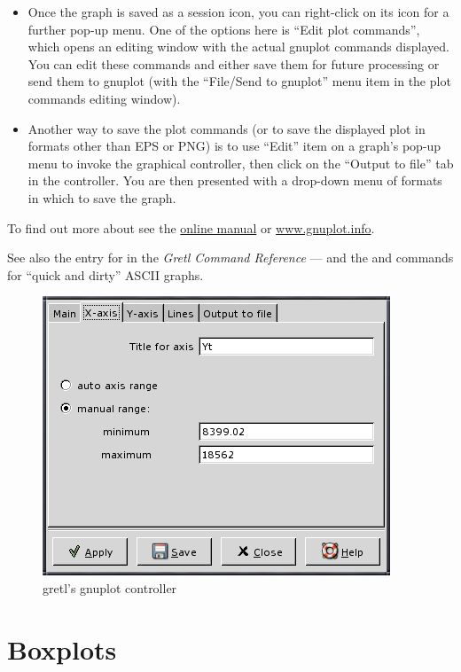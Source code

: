 \begin{itemize}
\item Once the graph is saved as a session icon, you can right-click
  on its icon for a further pop-up menu.  One of the options here is
  ``Edit plot commands'', which opens an editing window with the
  actual gnuplot commands displayed. You can edit these commands and
  either save them for future processing or send them to gnuplot (with
  the ``File/Send to gnuplot'' menu item in the plot commands editing
  window).
\item Another way to save the plot commands (or to save the displayed
  plot in formats other than EPS or PNG) is to use ``Edit'' item on a
  graph's pop-up menu to invoke the graphical controller, then click
  on the ``Output to file'' tab in the controller.  You are then
  presented with a drop-down menu of formats in which to save the
  graph.
\end{itemize}

To find out more about  see the
\href{http://ricardo.ecn.wfu.edu/gnuplot.html}{online manual} or
\href{http://www.gnuplot.info/}{www.gnuplot.info}.

See also the entry for  in the \emph{Gretl Command
  Reference} --- and the  and  commands for
``quick and dirty'' ASCII graphs.

\begin{figure}[htbp]
  \begin{center}
    \includegraphics[scale=0.5]{figures/plot_control}
  \end{center}
  \caption{gretl's gnuplot controller}
  \label{fig-plot}
\end{figure}


\section{Boxplots}
\label{sect-boxplots}

